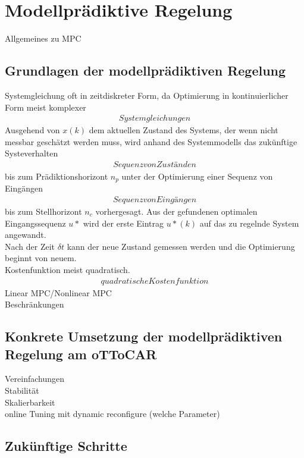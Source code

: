 \section{Modellpr\"adiktive Regelung}
Allgemeines zu MPC
\\
\subsection{Grundlagen der modellprädiktiven Regelung}
Systemgleichung oft in zeitdiskreter Form, da Optimierung in kontinuierlicher Form meist komplexer
\begin{align}
  Systemgleichungen
\end{align}
Ausgehend von $x(k)$ dem aktuellen Zustand des Systems, der wenn nicht messbar geschätzt werden muss, wird anhand des Systemmodells das zukünftige Systeverhalten
\begin{align}
  Sequenz von Zuständen
\end{align}
bis zum Prädiktionshorizont $n_p$ unter der Optimierung einer Sequenz von Eingängen
\begin{align}
  Sequenz von Eingängen
\end{align}
bis zum Stellhorizont $n_c$ vorhergesagt. Aus der gefundenen optimalen Eingangssequenz $u*$ wird der erste Eintrag $u*(k)$ auf das zu regelnde System angewandt.\\
Nach der Zeit $\delta t$ kann der neue Zustand gemessen werden und die Optimierung beginnt von neuem.\\
Kostenfunktion meist quadratisch.
\begin{align}
  quadratische Kostenfunktion
\end{align}
Linear MPC/Nonlinear MPC\\
Beschränkungen
\subsection{Konkrete Umsetzung der modellprädiktiven Regelung am oTToCAR}

Vereinfachungen\\
Stabilität\\
Skalierbarkeit\\
online Tuning mit dynamic reconfigure (welche Parameter)\\
\subsection{Zukünftige Schritte}